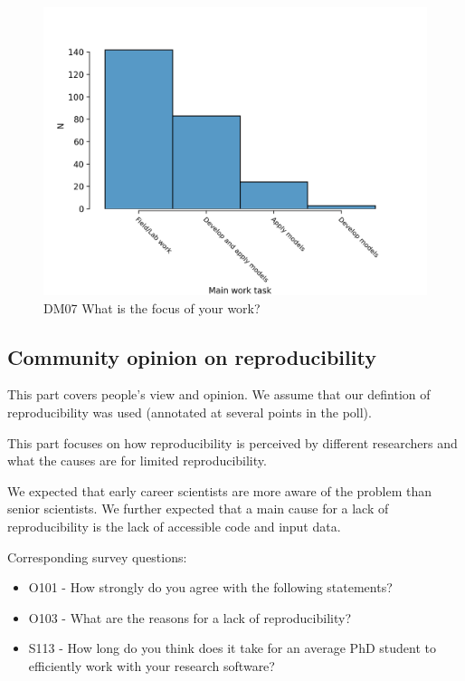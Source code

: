 \documentclass{article}
\begin{document}
\begin{figure}[!p]
    \centering
    \includegraphics[width=\textwidth]{../figs/DM07.png}
	\caption{DM07 What is the focus of your work?}
    \label{fig:dm07}
\end{figure}
\newpage

\subsection{Community opinion on reproducibility}
This part covers people's view and opinion. We assume that our defintion of reproducibility was used (annotated at several points in the poll).

This part focuses on how reproducibility is perceived by different researchers and what the causes are for limited reproducibility.

We expected that early career scientists are more aware of the problem than senior scientists. We further expected that a main cause for a lack of reproducibility is the lack of accessible code and input data.

Corresponding survey questions:
\begin{itemize}
	\item O101 - How strongly do you agree with the following statements?
	\item O103 - What are the reasons for a lack of reproducibility?
	\item S113 - How long do you think does it take for an average PhD student to efficiently work with your research software?
\end{itemize}
\end{document}
